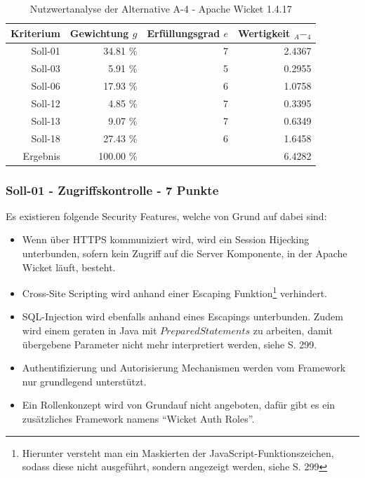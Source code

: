   \begin{table}[ht]
    \sffamily 
    \begin{center}
      \begin{tabular}{r|rrr}
        \toprule
        \textbf{Kriterium} & \textbf{Gewichtung \(g\)} & \textbf{Erfüllungsgrad
        \(e\)} & \textbf{Wertigkeit \(_A-_4\)} \\
        \midrule
        Soll-01   & 34.81 \% & 7 & 2.4367 \\
        Soll-03   &  5.91 \% & 5 & 0.2955 \\
        Soll-06   & 17.93 \% & 6 & 1.0758 \\
        Soll-12   &  4.85 \% & 7 & 0.3395 \\
        Soll-13   &  9.07 \% & 7 & 0.6349 \\
        Soll-18   & 27.43 \% & 6 & 1.6458 \\
        \midrule
        \midrule
        Ergebnis  & 100.00 \% &   & 6.4282 \\
        \bottomrule
      \end{tabular}
      \caption{Nutzwertanalyse der Alternative A-4 - Apache Wicket 1.4.17}
      \label{tab:nwaA4}
    \end{center}
  \end{table}
  
  \subsubsection{Soll-01 - Zugriffskontrolle - 7 Punkte}
  
  Es existieren folgende Security Features, welche von Grund auf dabei sind:
  
  \begin{itemize}
    \item Wenn über HTTPS kommuniziert wird, wird ein Session Hijecking
    unterbunden, sofern kein Zugriff auf die Server Komponente, in der Apache
    Wicket läuft, besteht.
    \item Cross-Site Scripting wird anhand einer Escaping
    Funktion\footnote{Hierunter versteht man ein Maskierten der
    JavaScript-Funktionszeichen, sodass diese nicht ausgeführt, sondern
    angezeigt werden, siehe \cite{Wicket} S. 299} verhindert.
    \item SQL-Injection wird ebenfalls anhand eines Escapings unterbunden. Zudem
    wird einem geraten in Java mit \(PreparedStatements\) zu arbeiten, damit
    übergebene Parameter nicht mehr interpretiert werden, siehe \cite{Wicket} S.
    299.
    \item Authentifizierung und Autorisierung Mechanismen werden vom Framework
    nur grundlegend unterstützt. 
    \item Ein Rollenkonzept wird von Grundauf nicht angeboten, dafür gibt es ein
    zusätzliches Framework namens ``Wicket Auth Roles''. 
  \end{itemize}
  
